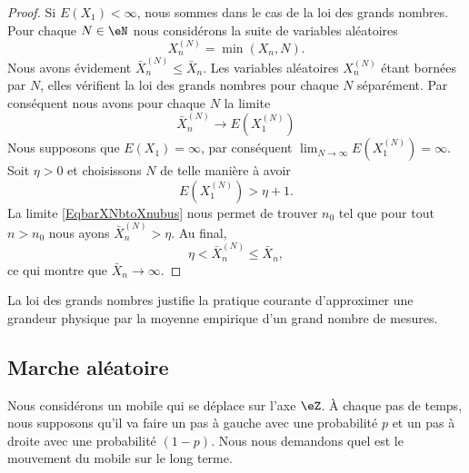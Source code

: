 \begin{proof}
    Si \( E(X_1)<\infty\), nous sommes dans le cas de la loi des grands nombres. Pour chaque \( N\in\eN\) nous considérons la suite de variables aléatoires
    \begin{equation}
        X_n^{(N)}=\min(X_n,N).
    \end{equation}
    Nous avons évidement \( \bar X^{(N)}_n\leq \bar X_n\). Les variables aléatoires \( X^{(N)}_n\) étant bornées par \( N\), elles vérifient la loi des grands nombres pour chaque \( N\) séparément. Par conséquent nous avons pour chaque \( N\) la limite
    \begin{equation}        \label{EqbarXNbtoXnubus}
        \bar X^{(N)}_n\to E(X^{(N)}_1)
    \end{equation}
    Nous supposons que \( E(X_1)=\infty\), par conséquent  \( \lim_{N\to\infty}E(X_1^{(N)})=\infty\). Soit \( \eta>0\) et choisissons \( N\) de telle manière à avoir
    \begin{equation}
        E(X_1^{(N)})>\eta+1.
    \end{equation}
    La limite \eqref{EqbarXNbtoXnubus} nous permet de trouver \( n_0\) tel que pour tout \( n>n_0\) nous ayons \( \bar X^{(N)}_n>\eta\). Au final,
    \begin{equation}
        \eta<\bar X^{(N)}_n\leq \bar X_n,
    \end{equation}
    ce qui montre que \( \bar X_n\to\infty\).
\end{proof}

\begin{example}
    La loi des grands nombres justifie la pratique courante d'approximer une grandeur physique par la moyenne empirique d'un grand nombre de mesures.
\end{example}

\subsection{Marche aléatoire}

Nous considérons un mobile qui se déplace sur l'axe \( \eZ\). À chaque pas de temps, nous supposons qu'il va faire un pas à gauche avec une probabilité \( p\) et un pas à droite avec une probabilité \( (1-p)\). Nous nous demandons quel est le mouvement du mobile sur le long terme.

